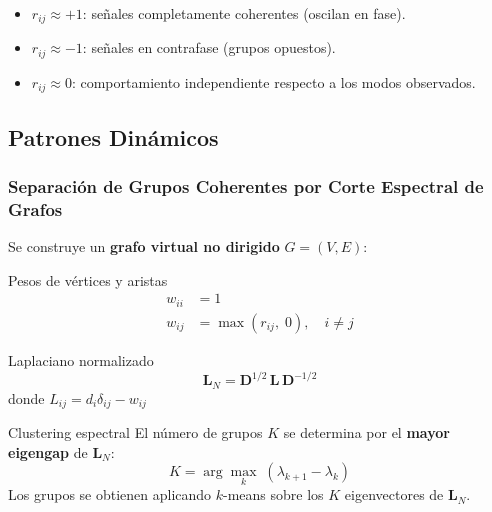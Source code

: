     \begin{itemize}
    \item $r_{ij} \approx +1$: señales completamente coherentes (oscilan en fase).
    \item $r_{ij} \approx -1$: señales en contrafase (grupos opuestos).
    \item $r_{ij} \approx 0$: comportamiento independiente respecto a los modos observados.
\end{itemize}


\subsection{Patrones Dinámicos}
\subsubsection{Separación de Grupos Coherentes por Corte Espectral de Grafos}

Se construye un \textbf{grafo virtual no dirigido} $G = (V, E)$:

\begin{block}{Pesos de vértices y aristas}
\begin{align}
    w_{ii} &= 1 \label{eq:vertex_w}\\[2pt]
    w_{ij} &= \max(r_{ij},\; 0),\quad i\neq j \label{eq:edge_w}
\end{align}
\end{block}

\begin{block}{Laplaciano normalizado}
\begin{equation}
    \mathbf{L}_N = \mathbf{D}^{1/2}\,\mathbf{L}\,\mathbf{D}^{-1/2}
    \label{eq:laplacian}
\end{equation}
donde $L_{ij} = d_i\delta_{ij} - w_{ij}$
\end{block}

\begin{exampleblock}{Clustering espectral}
    El número de grupos $K$ se determina por el \textbf{mayor eigengap} de $\mathbf{L}_N$:
    \begin{equation}
        K = \arg\max_k\;
        (\lambda_{k+1} - \lambda_k)
        \label{eq:eigengap}
    \end{equation}
    Los grupos se obtienen aplicando $k$-means sobre los $K$ eigenvectores de $\mathbf{L}_N$.
\end{exampleblock}

